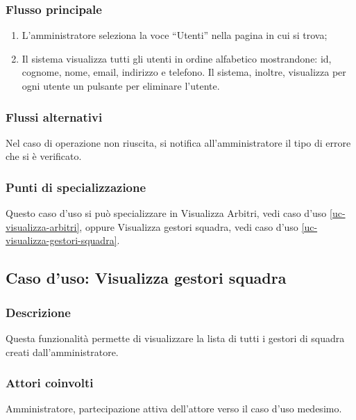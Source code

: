 \subsubsection*{Flusso principale}

\begin{enumerate}
	
	\item
	L'amministratore seleziona la voce ``Utenti'' nella pagina in cui si trova;
	
	\item
	Il sistema visualizza tutti gli utenti in ordine alfabetico mostrandone: id, cognome, nome, email, indirizzo e telefono. Il sistema, inoltre, visualizza per ogni utente un pulsante per eliminare l'utente.
	
\end{enumerate}

\subsubsection*{Flussi alternativi}
Nel caso di operazione non riuscita, si notifica all'amministratore il tipo di errore che si è verificato.

\subsubsection*{Punti di specializzazione}
Questo caso d'uso si può specializzare in Visualizza Arbitri, vedi caso d'uso \vref{uc-visualizza-arbitri}, oppure Visualizza gestori squadra, vedi caso d'uso \vref{uc-visualizza-gestori-squadra}.


%
%
\subsection{Caso d'uso: Visualizza gestori squadra}
\label{uc-visualizza-gestori-squadra}

\subsubsection*{Descrizione}
Questa funzionalità permette di visualizzare la lista di tutti i gestori di squadra creati dall'amministratore.

\subsubsection*{Attori coinvolti}
Amministratore, partecipazione attiva dell'attore verso il caso d'uso medesimo.

